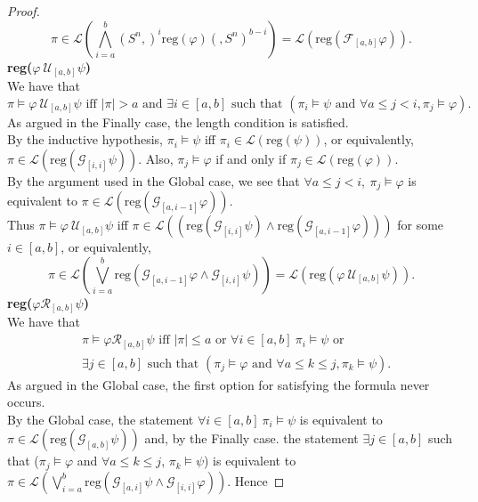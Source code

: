 \documentclass[runningheads]{llncs}
\renewcommand{\phi}{\varphi}
\begin{document}
\begin{proof}
 $$\pi \in \mathscr{L}\left(\bigwedge_{i=a}^{b} (S^n,)^i \text{reg}(\phi)(,S^n)^{b-i}\right) = \mathscr{L}(\text{reg}(\mathcal{F}_{[a,b]}\varphi)).$$
 \noindent \textbf{reg($\varphi \ \mathcal{U}_{[a,b]} \psi$)}\\
  We have that 
  $$\pi \vDash \varphi \ \mathcal{U}_{[a,b]} \psi \text{ iff } |\pi| > a \text{ and } \exists i \in [a,b] \text{ such that } (\pi_i \vDash \psi \text{ and } \forall a \leq j < i, \pi_j \vDash \varphi).$$
  As argued in the Finally case, the length condition is satisfied.\\
  By the inductive hypothesis, $\pi_i \vDash \psi$ iff $\pi_i \in \mathscr{L}(\text{reg}(\psi))$, or equivalently, \\
  $\pi \in \mathscr{L}(\text{reg}(\mathcal{G}_{[i,i]} \psi))$. Also, $\pi_j \vDash \varphi$ if and only if $\pi_j \in \mathscr{L}(\text{reg}(\varphi))$.\\
  By the argument used in the Global case, we see that $\forall a \leq j < i, \ \pi_j \vDash \varphi$ is equivalent to $\pi \in \mathscr{L}(\text{reg}(\mathcal{G}_{[a, i-1]} \varphi))$.\\
  Thus $\pi \vDash \varphi \ \mathcal{U}_{[a,b]} \psi$ iff $\pi \in \mathscr{L}((\text{reg}(\mathcal{G}_{[i,i]} \psi) \land \text{reg}( \mathcal{G}_{[a, i-1]} \varphi)))$ for some $i \in [a,b]$, or equivalently, 
  $$\pi \in \mathscr{L}\left(\bigvee_{i=a}^{b} \text{reg}\left(\mathcal{G}_{[a,i-1]}\phi \land \mathcal{G}_{[i, i]} \psi\right)\right) = \mathscr{L}\left(\text{reg}(\varphi \ \mathcal{U}_{[a,b]} \psi)\right).$$
  \noindent \textbf{reg($\varphi \mathcal{R}_{[a,b]} \psi$)}\\
  We have that
  \begin{align*}
    &\pi \vDash \varphi \mathcal{R}_{[a,b]} \psi \text{ iff } |\pi| \leq a \text{ or } \forall i \in [a,b] \ \pi_i \vDash \psi \text{ or } \\ 
    &\exists j\in[a,b] \text{ such that }
    (\pi_j \vDash \varphi \text{ and } \forall a\leq k \leq j, \pi_k \vDash \psi).
  \end{align*}
  As argued in the Global case, the first option for satisfying the formula never occurs.\\
  By the Global case, the statement $\forall i\in[a,b] \ \pi_i \vDash \psi$ is equivalent to $\pi \in \mathscr{L}(\text{reg}(\mathcal{G}_{[a,b]} \psi))$ and, by the Finally case. the statement $\exists j\in[a,b]$ such that ($\pi_j \vDash \varphi$ and $\forall a\leq k \leq j$, $\pi_k \vDash \psi$) is equivalent to $\pi \in \mathscr{L}\left(\bigvee_{i=a}^{b} \text{reg}\left(\mathcal{G}_{[a,i]}\psi \land \mathcal{G}_{[i, i]} \phi\right)\right)$. Hence 

\end{proof}
\end{document}
